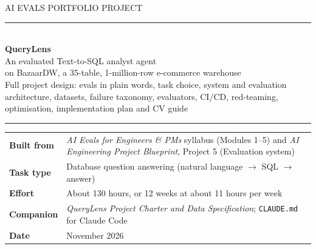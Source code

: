 \documentclass[11pt,a4paper]{article}
\newcommand{\code}[1]{\texttt{\small #1}}
\begin{document}
\begin{titlepage}
\thispagestyle{empty}
\vspace*{1.5cm}
{\color{grey}\large AI EVALS PORTFOLIO PROJECT}\\[6pt]
{\color{accent}\rule{\linewidth}{1.2pt}}\\[14pt]
{\fontsize{34}{40}\selectfont\bfseries QueryLens}\\[10pt]
{\LARGE An evaluated Text-to-SQL analyst agent}\\[4pt]{\large on BazaarDW, a 35-table, 1-million-row e-commerce warehouse}\\[8pt]
{\large\color{grey} Full project design: evals in plain words, task choice, system and
evaluation architecture, datasets, failure taxonomy, evaluators, CI/CD, red-teaming,
optimisation, implementation plan and CV guide}\\[6pt]
{\color{accent}\rule{\linewidth}{1.2pt}}

\vspace{1.2cm}


\vfill
\begin{tabularx}{\linewidth}{@{}lX@{}}
\textbf{Built from} & \emph{AI Evals for Engineers \& PMs} syllabus (Modules 1--5) and
\emph{AI Engineering Project Blueprint}, Project 5 (Evaluation system)\\
\textbf{Task type} & Database question answering (natural language $\rightarrow$ SQL $\rightarrow$ answer)\\
\textbf{Effort} & About 130 hours, or 12 weeks at about 11 hours per week\\
\textbf{Companion} & \emph{QueryLens Project Charter and Data Specification}; \code{CLAUDE.md} for Claude Code\\
\textbf{Date} & November 2026\\
\end{tabularx}
\end{titlepage}
\end{document}
